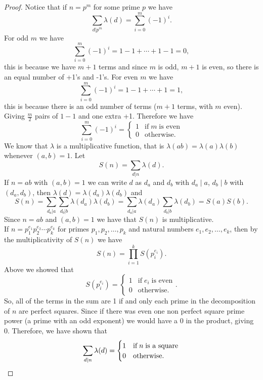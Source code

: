 \documentclass[12pt]{article}
\begin{document}
\begin{proof}
    Notice that if $n=p^m$ for some prime $p$ we have
    \[
        \sum_{d|p^m}\lambda(d)=\sum_{i=0}^{m}(-1)^i.
    \]
    For odd $m$ we have
    \[
        \sum_{i=0}^{m}(-1)^i=1-1+\cdots+1-1=0,
    \]
    this is because we have $m+1$ terms and since $m$ is odd, $m+1$ is even, so there is an equal number of +1's and -1's.
    For even $m$ we have
    \[
        \sum_{i=0}^{m}(-1)^i=1-1+\cdots+1=1,
    \]
    this is because there is an odd number of terms ($m+1$ terms, with $m$ even). Giving $\frac{m}{2}$ pairs of $1-1$ and one extra +1. Therefore we have
    \[
        \sum_{i=0}^{m}(-1)^i=\begin{cases}1&\text{if}\; m \;\text{is even}\\0&\text{otherwise.}\end{cases}
    \]
    We know that $\lambda$ is a multiplicative function, that is $\lambda(ab)=\lambda(a)\lambda(b)$ whenever $(a,b)=1$. Let
    \[
        S(n)=\sum_{d|n}\lambda(d).
    \]
    If $n=ab$ with $(a,b)=1$ we can write $d$ as $d_a$ and $d_b$ with $d_a\mid a$, $d_b\mid b$ with $(d_a,d_b)$, then $\lambda(d)=\lambda(d_a)\lambda(d_b)$ and
    \[
        S(n)=\sum_{d_a|a}\sum_{d_b|b}\lambda(d_a)\lambda(d_b)=\sum_{d_a|a}\lambda(d_a)\sum_{d_b|b}\lambda(d_b)=S(a)S(b).
    \]
    Since $n=ab$ and $(a,b)=1$ we have that $S(n)$ is multiplicative.\\
    If $n=p_1^{e_1}p_2^{e_2}\cdots p_k^{e_k}$ for primes $p_1,p_2,\dots,p_k$ and natural numbers $e_1,e_2,\dots,e_k$, then by the multiplicativity of $S(n)$ we have
    \[
        S(n)=\prod_{i=1}^{k}S(p_i^{e_i}).
    \]
    Above we showed that 
    \[
        S(p_i^{e_i})=\begin{cases}1&\text{if}\; e_i \;\text{is even}\\0&\text{otherwise.}\end{cases}.
    \]
    So, all of the terms in the sum are 1 if and only each prime in the decomposition of $n$ are perfect squares. Since if there was even one non perfect square prime power (a prime with an odd exponent) we would have a 0 in the product, giving 0. Therefore, we have shown that
    \[
        \sum_{d|n}\lambda(d)=\begin{cases}1&\text{if}\; n \;\text{is a square}\\0&\text{otherwise.}\end{cases}\qedhere
    \]
\end{proof}
\end{document}
